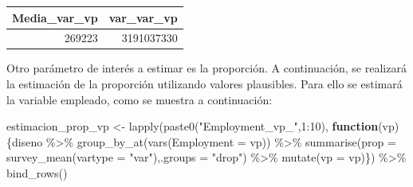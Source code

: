 \documentclass[
  12pt,
]{book}
\newenvironment{Shaded}{\begin{snugshade}}{\end{snugshade}}
\newcommand{\AttributeTok}[1]{\textcolor[rgb]{0.77,0.63,0.00}{#1}}
\newcommand{\ControlFlowTok}[1]{\textcolor[rgb]{0.13,0.29,0.53}{\textbf{#1}}}
\newcommand{\DecValTok}[1]{\textcolor[rgb]{0.00,0.00,0.81}{#1}}
\newcommand{\FunctionTok}[1]{\textcolor[rgb]{0.00,0.00,0.00}{#1}}
\newcommand{\NormalTok}[1]{#1}
\newcommand{\OtherTok}[1]{\textcolor[rgb]{0.56,0.35,0.01}{#1}}
\newcommand{\SpecialCharTok}[1]{\textcolor[rgb]{0.00,0.00,0.00}{#1}}
\newcommand{\StringTok}[1]{\textcolor[rgb]{0.31,0.60,0.02}{#1}}
\begin{document}
\begin{Shaded}
\end{Shaded}

\begin{tabular}{r|r}
\hline
Media\_var\_vp & var\_var\_vp\\
\hline
269223 & 3191037330\\
\hline
\end{tabular}

Otro parámetro de interés a estimar es la proporción. A continuación, se realizará la estimación de la proporción utilizando valores plausibles. Para ello se estimará la variable empleado, como se muestra a continuación:

\begin{Shaded}
\begin{Highlighting}[]
\NormalTok{estimacion\_prop\_vp }\OtherTok{\textless{}{-}} \FunctionTok{lapply}\NormalTok{(}\FunctionTok{paste0}\NormalTok{(}\StringTok{"Employment\_vp\_"}\NormalTok{,}\DecValTok{1}\SpecialCharTok{:}\DecValTok{10}\NormalTok{),}
       \ControlFlowTok{function}\NormalTok{(vp)\{diseno }\SpecialCharTok{\%\textgreater{}\%} \FunctionTok{group\_by\_at}\NormalTok{(}\FunctionTok{vars}\NormalTok{(}\AttributeTok{Employment =}\NormalTok{ vp)) }\SpecialCharTok{\%\textgreater{}\%} 
  \FunctionTok{summarise}\NormalTok{(}\AttributeTok{prop =} \FunctionTok{survey\_mean}\NormalTok{(}\AttributeTok{vartype =} \StringTok{"var"}\NormalTok{),}\AttributeTok{.groups =} \StringTok{"drop"}\NormalTok{) }\SpecialCharTok{\%\textgreater{}\%}
         \FunctionTok{mutate}\NormalTok{(}\AttributeTok{vp =}\NormalTok{ vp)\}) }\SpecialCharTok{\%\textgreater{}\%} \FunctionTok{bind\_rows}\NormalTok{()}
\end{Highlighting}
\end{Shaded}
\end{document}
